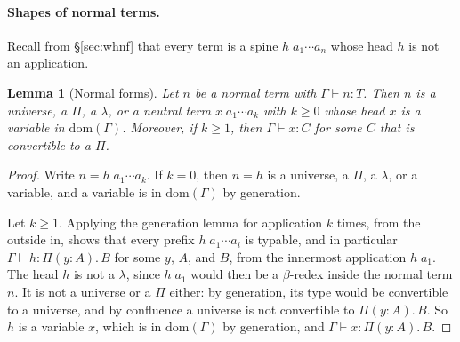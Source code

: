 \documentclass[acmsmall,screen,nonacm]{acmart}
\newtheorem{lemma}[theorem]{Lemma}
\newcommand{\tPi}[3]{\Pi(#1{:}#2).\,#3}
\newcommand{\dom}{\mathrm{dom}}
\begin{document}
\paragraph{Shapes of normal terms.}
Recall from \S\ref{sec:whnf} that every term is a spine $h\;a_1 \cdots a_n$ whose head $h$ is not an application.

\begin{lemma}[Normal forms]
\label{lem:normal-shape}
Let $n$ be a normal term with $\Gamma \vdash n : T$.
Then $n$ is a universe, a $\Pi$, a $\lambda$, or a \emph{neutral} term $x\;a_1 \cdots a_k$ with $k \ge 0$ whose head $x$ is a variable in $\dom(\Gamma)$.
Moreover, if $k \ge 1$, then $\Gamma \vdash x : C$ for some $C$ that is convertible to a $\Pi$.
\end{lemma}

\begin{proof}
Write $n = h\;a_1 \cdots a_k$.
If $k = 0$, then $n = h$ is a universe, a $\Pi$, a $\lambda$, or a variable, and a variable is in $\dom(\Gamma)$ by generation.

Let $k \ge 1$.
Applying the generation lemma for application $k$ times, from the outside in, shows that every prefix $h\;a_1 \cdots a_i$ is typable,
and in particular $\Gamma \vdash h : \tPi{y}{A}{B}$ for some $y$, $A$, and $B$, from the innermost application $h\;a_1$.
The head $h$ is not a $\lambda$, since $h\;a_1$ would then be a $\beta$-redex inside the normal term $n$.
It is not a universe or a $\Pi$ either: by generation, its type would be convertible to a universe, and by confluence a universe is not convertible to $\tPi{y}{A}{B}$.
So $h$ is a variable $x$, which is in $\dom(\Gamma)$ by generation, and $\Gamma \vdash x : \tPi{y}{A}{B}$.
\end{proof}
\end{document}
